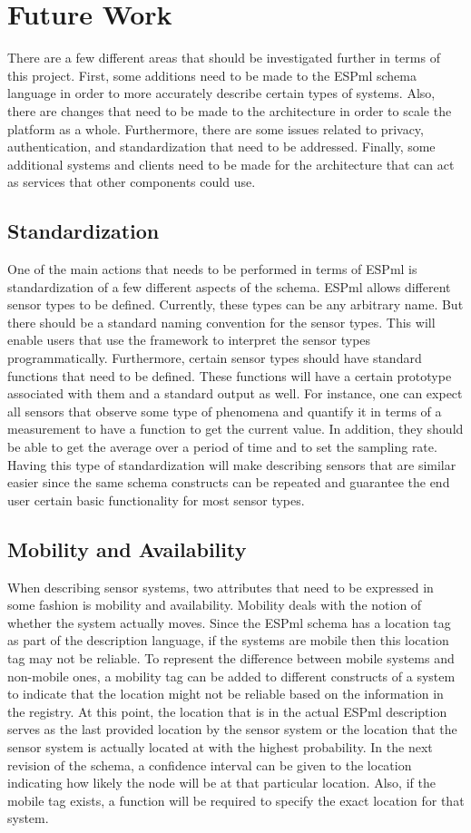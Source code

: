 \section{Future Work} \label{sec:future_work}
There are a few different areas that should be investigated further
in terms of this project.  First, some additions need to be made to
the ESPml schema language in order to more accurately describe certain
types of systems.  Also, there are changes that need to be made to the
architecture in order to scale the platform as a whole.  Furthermore, there are
some issues related to privacy, authentication, and standardization
that need to be addressed.  Finally, some additional systems and clients need to
be made for the architecture that can act as services that other
components could use.
\subsection{Standardization}
One of the main actions that needs to be performed in terms of ESPml is
standardization of a few different aspects of the schema.  ESPml
allows different sensor types to be defined.  Currently, these types
can be any arbitrary name.  But there should be a standard naming
convention for the sensor types.  This will enable users that use the
framework to interpret the sensor types programmatically.
Furthermore, certain sensor types should have standard functions that
need to be defined.  These functions will have a certain prototype
associated with them and a standard output as well.  For instance, one
can expect all sensors that observe some type of phenomena and
quantify it in terms of a measurement to have a function to get the
current value.  In addition, they should be able to get the average
over a period of time and to set the sampling rate.  Having
this type of standardization will make describing sensors that are
similar easier since the same schema constructs can be repeated and
guarantee the end user certain basic functionality for most sensor
types.
\subsection{Mobility and Availability}
When describing sensor systems, two attributes that need to be
expressed in some fashion is mobility and availability.
Mobility deals with the notion of whether the system actually moves.  Since the ESPml
schema has a location tag as part of the description language, if the
systems are mobile then this location tag may not be reliable.  To
represent the difference between mobile systems and non-mobile
ones, a mobility tag can be added to different constructs of a system
to indicate that the location might not be reliable based on the information
in the registry.  At this point, the location that is in the actual ESPml
description serves as the last provided location by the sensor system
or the location that the sensor system is actually located at with the
highest probability.  In the next revision of the schema, a confidence
interval can be given to the location indicating how likely the node
will be at that particular location.  Also, if the mobile tag exists, a function
will be required to specify the exact location for that system.  

